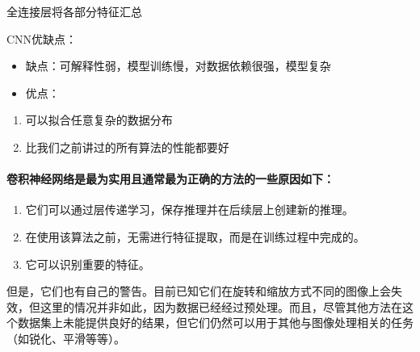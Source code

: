 \documentclass[letterpaper,10pt,english]{sphinxmanual}
\begin{document}
全连接层将各部分特征汇总%
\begin{footnote}[944]\sphinxAtStartFootnote
{}
%
\end{footnote}

CNN优缺点：
\begin{itemize}
\item {} 
缺点：可解释性弱，模型训练慢，对数据依赖很强，模型复杂

\item {} 
优点：

\end{itemize}
\begin{enumerate}
%
\item {} 
可以拟合任意复杂的数据分布

\item {} 
比我们之前讲过的所有算法的性能都要好

\end{enumerate}


\paragraph{卷积神经网络是最为实用且通常最为正确的方法的一些原因如下：}
\label{\detokenize{chapter_AI_dive/DL:id3}}\begin{enumerate}
%
\item {} 
它们可以通过层传递学习，保存推理并在后续层上创建新的推理。

\item {} 
在使用该算法之前，无需进行特征提取，而是在训练过程中完成的。

\item {} 
它可以识别重要的特征。

\end{enumerate}

但是，它们也有自己的警告。目前已知它们在旋转和缩放方式不同的图像上会失效，但这里的情况并非如此，因为数据已经经过预处理。而且，尽管其他方法在这个数据集上未能提供良好的结果，但它们仍然可以用于其他与图像处理相关的任务（如锐化、平滑等等）。%
\begin{footnote}[945]\sphinxAtStartFootnote
{}
%
\end{footnote}
\end{document}
